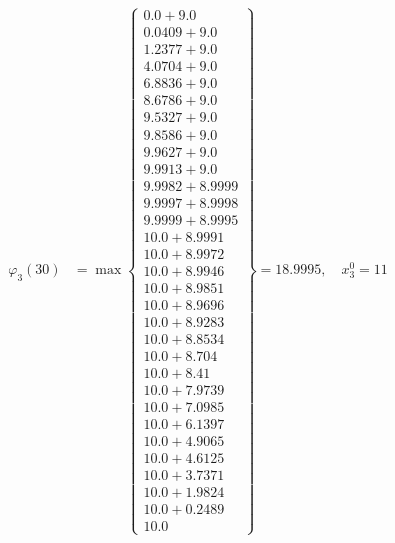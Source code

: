 \documentclass{article}
\begin{document}
\begin{align*}
  
\varphi_{3}(30) &= \max \left\{ \begin{array}{c}
0.0 + 9.0 \\
 0.0409 + 9.0 \\
 1.2377 + 9.0 \\
 4.0704 + 9.0 \\
 6.8836 + 9.0 \\
 8.6786 + 9.0 \\
 9.5327 + 9.0 \\
 9.8586 + 9.0 \\
 9.9627 + 9.0 \\
 9.9913 + 9.0 \\
 9.9982 + 8.9999 \\
 9.9997 + 8.9998 \\
 9.9999 + 8.9995 \\
 10.0 + 8.9991 \\
 10.0 + 8.9972 \\
 10.0 + 8.9946 \\
 10.0 + 8.9851 \\
 10.0 + 8.9696 \\
 10.0 + 8.9283 \\
 10.0 + 8.8534 \\
 10.0 + 8.704 \\
 10.0 + 8.41 \\
 10.0 + 7.9739 \\
 10.0 + 7.0985 \\
 10.0 + 6.1397 \\
 10.0 + 4.9065 \\
 10.0 + 4.6125 \\
 10.0 + 3.7371 \\
 10.0 + 1.9824 \\
 10.0 + 0.2489 \\
 10.0
\end{array} \right\}=18.9995,\quad x_{3}^0=11\\
  
  
  

\end{align*}
\end{document}
